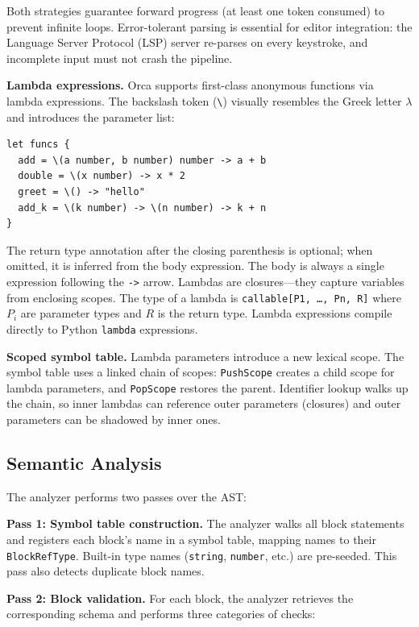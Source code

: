 \documentclass[sigconf,nonacm]{acmart}
\begin{document}
Both strategies guarantee forward progress (at least one token consumed)
to prevent infinite loops. Error-tolerant parsing is essential for
editor integration: the Language Server Protocol (LSP) server
re-parses on every keystroke, and incomplete input must not crash the
pipeline.

\noindent\textbf{Lambda expressions.} Orca supports first-class anonymous
functions via lambda expressions. The backslash token (\texttt{\textbackslash})
visually resembles the Greek letter $\lambda$ and introduces the parameter list:

\begin{lstlisting}
let funcs {
  add = \(a number, b number) number -> a + b
  double = \(x number) -> x * 2
  greet = \() -> "hello"
  add_k = \(k number) -> \(n number) -> k + n
}
\end{lstlisting}

\noindent The return type annotation after the closing parenthesis is optional;
when omitted, it is inferred from the body expression. The body is always a
single expression following the \texttt{->} arrow. Lambdas are closures---they
capture variables from enclosing scopes. The type of a lambda is
\texttt{callable[P1, \ldots, Pn, R]} where $P_i$ are parameter types and $R$
is the return type. Lambda expressions compile directly to Python
\texttt{lambda} expressions.

\noindent\textbf{Scoped symbol table.} Lambda parameters introduce a new
lexical scope. The symbol table uses a linked chain of scopes: \texttt{PushScope}
creates a child scope for lambda parameters, and \texttt{PopScope} restores the
parent. Identifier lookup walks up the chain, so inner lambdas can reference
outer parameters (closures) and outer parameters can be shadowed by inner ones.

\subsection{Semantic Analysis}
\label{sec:compiler:analyzer}

The analyzer performs two passes over the AST:

\noindent\textbf{Pass 1: Symbol table construction.} The analyzer walks
all block statements and registers each block's name in a symbol table,
mapping names to their \texttt{BlockRefType}. Built-in type names
(\texttt{string}, \texttt{number}, etc.) are pre-seeded. This
pass also detects duplicate block names.

\noindent\textbf{Pass 2: Block validation.} For each block, the analyzer
retrieves the corresponding schema and performs three categories of checks:
\end{document}
